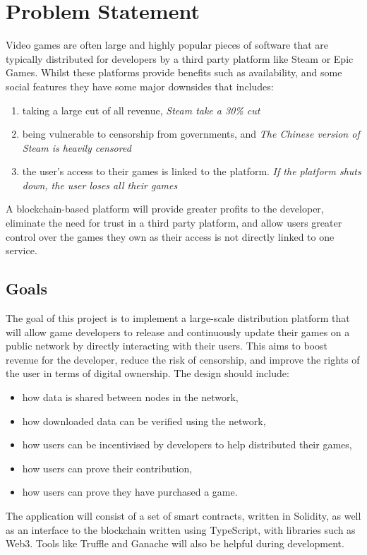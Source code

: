 
\chapter{Problem Statement}

Video games are often large and highly popular pieces of software that are typically distributed for developers by a third party platform like Steam or Epic Games. Whilst these platforms provide benefits such as availability, and some social features they have some major downsides that includes:
\vspace{1mm}
\begin{enumerate}[label=(\alph*)]
  \item taking a large cut of all revenue, \newline\textit{Steam take a 30\% cut}
  \item being vulnerable to censorship from governments, and \newline\textit{The Chinese version of Steam is heavily censored}
  \item the user's access to their games is linked to the platform. \newline\textit{If the platform shuts down, the user loses all their games}
\end{enumerate}
\vspace{1mm}
\noindent A blockchain-based platform will provide greater profits to the developer, eliminate the need for trust in a third party platform, and allow users greater control over the games they own as their access is not directly linked to one service.

\section{Goals}

The goal of this project is to implement a large-scale distribution platform that will allow game developers to release and continuously update their games on a public network by directly interacting with their users. This aims to boost revenue for the developer, reduce the risk of censorship, and improve the rights of the user in terms of digital ownership. The design should include:
\vspace{1mm}
\begin{itemize}
  \item how data is shared between nodes in the network,
  \item how downloaded data can be verified using the network,
  \item how users can be incentivised by developers to help distributed their games,
  \item how users can prove their contribution,
  \item how users can prove they have purchased a game.
\end{itemize}
\vspace{1mm}
\noindent The application will consist of a set of smart contracts, written in Solidity, as well as an interface to the blockchain written using TypeScript, with libraries such as Web3. Tools like Truffle and Ganache will also be helpful during development. 

